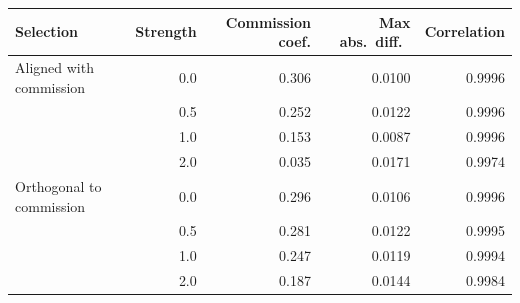 \begin{tabular}{lrrrr}
\hline\hline
Selection & Strength & Commission coef. & Max abs.\ diff.\ & Correlation \\
\hline
Aligned with commission & 0.0 & 0.306 & 0.0100 & 0.9996 \\
 & 0.5 & 0.252 & 0.0122 & 0.9996 \\
 & 1.0 & 0.153 & 0.0087 & 0.9996 \\
 & 2.0 & 0.035 & 0.0171 & 0.9974 \\
\hline
Orthogonal to commission & 0.0 & 0.296 & 0.0106 & 0.9996 \\
 & 0.5 & 0.281 & 0.0122 & 0.9995 \\
 & 1.0 & 0.247 & 0.0119 & 0.9994 \\
 & 2.0 & 0.187 & 0.0144 & 0.9984 \\
\hline\hline
\end{tabular}
